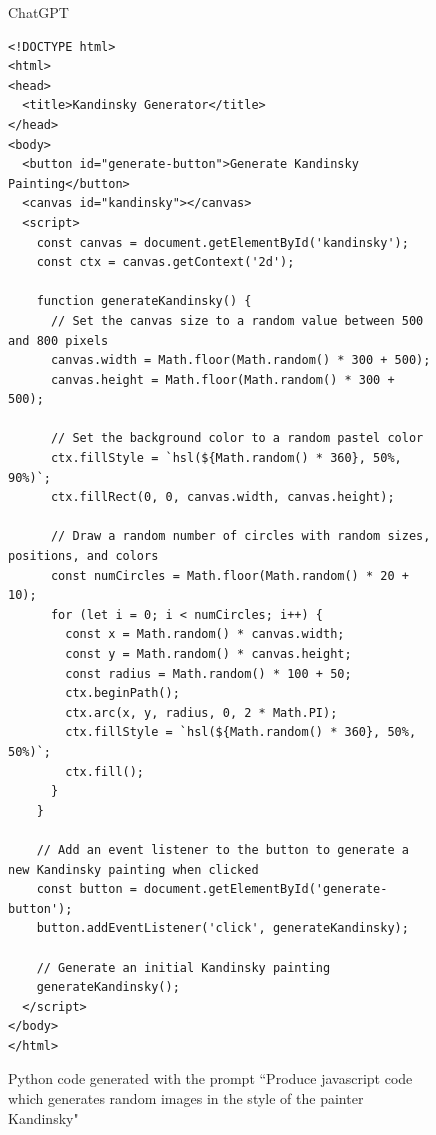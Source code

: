 \begin{figure}[H]
\begin{AIbox}{ChatGPT}
\begin{verbatim}
<!DOCTYPE html>
<html>
<head>
  <title>Kandinsky Generator</title>
</head>
<body>
  <button id="generate-button">Generate Kandinsky Painting</button>
  <canvas id="kandinsky"></canvas>
  <script>
    const canvas = document.getElementById('kandinsky');
    const ctx = canvas.getContext('2d');

    function generateKandinsky() {
      // Set the canvas size to a random value between 500 and 800 pixels
      canvas.width = Math.floor(Math.random() * 300 + 500);
      canvas.height = Math.floor(Math.random() * 300 + 500);

      // Set the background color to a random pastel color
      ctx.fillStyle = `hsl(${Math.random() * 360}, 50%, 90%)`;
      ctx.fillRect(0, 0, canvas.width, canvas.height);

      // Draw a random number of circles with random sizes, positions, and colors
      const numCircles = Math.floor(Math.random() * 20 + 10);
      for (let i = 0; i < numCircles; i++) {
        const x = Math.random() * canvas.width;
        const y = Math.random() * canvas.height;
        const radius = Math.random() * 100 + 50;
        ctx.beginPath();
        ctx.arc(x, y, radius, 0, 2 * Math.PI);
        ctx.fillStyle = `hsl(${Math.random() * 360}, 50%, 50%)`;
        ctx.fill();
      }
    }

    // Add an event listener to the button to generate a new Kandinsky painting when clicked
    const button = document.getElementById('generate-button');
    button.addEventListener('click', generateKandinsky);

    // Generate an initial Kandinsky painting
    generateKandinsky();
  </script>
</body>
</html>
\end{verbatim}
\end{AIbox}
	\caption{Python code generated with the prompt ``Produce javascript code which generates random images in the style of the painter Kandinsky"}
	\label{fig:artprog2}
\end{figure}

